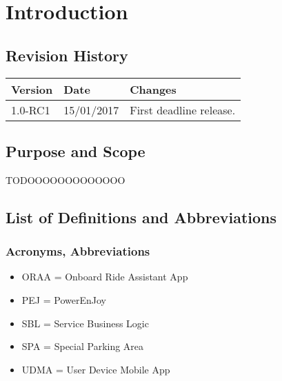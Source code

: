 \section{Introduction}

\subsection{Revision History}
\begin{tabular}{| l | l | p{10cm} |}
\hline
\textbf{Version} & \textbf{Date} & \textbf{Changes}\\
\hline
1.0-RC1 & 15/01/2017 & First deadline release.\\
\hline
\end{tabular}

\subsection{Purpose and Scope}
TODOOOOOOOOOOOOO


\subsection{List of Definitions and Abbreviations}
\subsubsection{Acronyms, Abbreviations}
\begin{itemize}
    \item ORAA = Onboard Ride Assistant App
    \item PEJ = PowerEnJoy
    \item SBL = Service Business Logic
    \item SPA = Special Parking Area
    \item UDMA = User Device Mobile App
\end{itemize}
